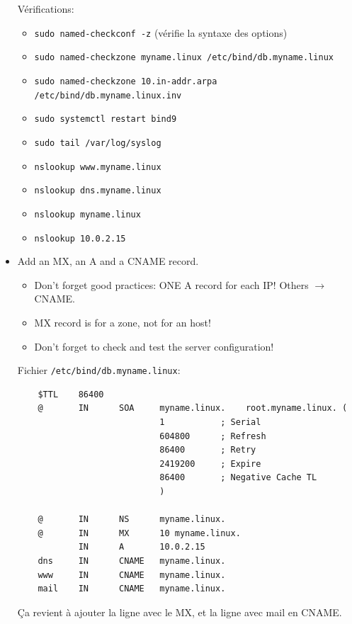 \documentclass[a4paper]{article}
\begin{document}
\begin{itemize}
\begin{example}
Vérifications:
\begin{itemize}
    \item \texttt{sudo named-checkconf -z} (vérifie la syntaxe des options)
    \item \texttt{sudo named-checkzone myname.linux /etc/bind/db.myname.linux}
    \item \texttt{sudo named-checkzone 10.in-addr.arpa /etc/bind/db.myname.linux.inv}
    \item \texttt{sudo systemctl restart bind9}
    \item \texttt{sudo tail /var/log/syslog}
    \item \texttt{nslookup www.myname.linux}
    \item \texttt{nslookup dns.myname.linux}
    \item \texttt{nslookup myname.linux}
    \item \texttt{nslookup 10.0.2.15}
\end{itemize}

\end{example}

\item Add an MX, an A and a CNAME record.
\begin{itemize}
    \item Don’t forget good practices: ONE A record for each IP! Others $ \rightarrow $ CNAME.
    \item MX record is for a zone, not for an host!
    \item Don’t forget to check and test the server configuration!
\end{itemize}
\begin{example}
Fichier \texttt{/etc/bind/db.myname.linux}:
\begin{verbatim}
    $TTL    86400
    @       IN      SOA     myname.linux.    root.myname.linux. (
                            1           ; Serial
                            604800      ; Refresh
                            86400       ; Retry
                            2419200     ; Expire
                            86400       ; Negative Cache TL
                            )

    @       IN      NS      myname.linux.
    @       IN      MX      10 myname.linux.
            IN      A       10.0.2.15
    dns     IN      CNAME   myname.linux.
    www     IN      CNAME   myname.linux.
    mail    IN      CNAME   myname.linux.
\end{verbatim}
Ça revient à ajouter la ligne avec le MX, et la ligne avec mail en CNAME.
\end{example}


\end{itemize}
\end{document}
